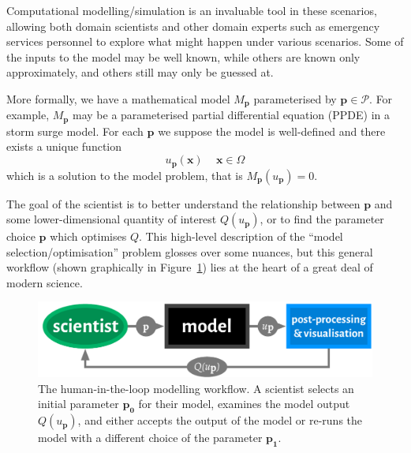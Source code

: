 \documentclass[a4paper,fontsize=12pt]{scrartcl}
\begin{document}
Computational modelling/simulation is an invaluable tool in these
scenarios, allowing both domain scientists and other domain experts
such as emergency services personnel to explore what might happen
under various scenarios. Some of the inputs to the model may be well
known, while others are known only approximately, and others still may
only be guessed at.

More formally, we have a mathematical model $M_{\mathbf{p}}$
parameterised by $\mathbf{p}\in\mathcal{P}$. For example, $M_{\mathbf{p}}$ may
be a parameterised partial differential equation (PPDE) in a storm
surge model. For each $\mathbf{p}$ we suppose the model is
well-defined and there exists a unique function
\begin{equation}
  \label{eq:1}
  u_{\mathbf{p}}(\mathbf{x})\, \quad \mathbf{x}\in\Omega
\end{equation}
which is a solution to the model problem, that is $M_{\mathbf{p}}(u_{\mathbf{p}})=0$.

The goal of the scientist is to better understand the relationship
between $\mathbf{p}$ and some lower-dimensional quantity of interest
$Q(u_{\mathbf{p}})$, or to find the parameter choice $\mathbf{p}$
which optimises $Q$. %
This high-level description of the ``model selection/optimisation''
problem glosses over some nuances, but this general workflow (shown
graphically in Figure~\ref{fig:general-fb-loop}) lies at the heart of
a great deal of modern science.

\begin{figure}
  \centering
  \includegraphics[width=.6\textwidth]{figures/general-fb-loop.pdf}
  \caption{The human-in-the-loop modelling workflow. A scientist
    selects an initial parameter $\mathbf{p_0}$ for their model,
    examines the model output $Q(u_{\mathbf{p}})$, and either accepts
    the output of the model or re-runs the model with a different
    choice of the parameter $\mathbf{p_1}$.}
  \label{fig:general-fb-loop}
\end{figure}
\end{document}
